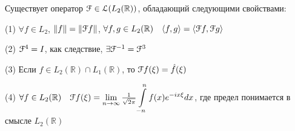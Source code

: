 \documentclass[a4paper,12pt]{report}
\begin{document}
\begin{thm}[Планшереля]Существует оператор $\EuScript F\in\EuScript L(L_2(\mathbb R))$, обладающий следующими свойствами:

(1) $\forall f\in L_2$, $\|f\|=\|\EuScript F f\|$, $\forall f,g\in L_2(\mathbb R)\quad\langle f,g\rangle=\langle\EuScript F f,\EuScript Fg\rangle$

(2) $\EuScript F^4=I$, как следствие, $\exists\EuScript F^{-1}=\EuScript F^3$

(3) Если $f\in L_2(\mathbb R)\cap L_1(\mathbb R)$, то $\EuScript F f(\xi)=\hat f(\xi)$

(4) $\forall f\in L_2(\mathbb R)\quad\EuScript Ff(\xi)=\lim\limits_{n\to\infty}\frac1{\sqrt{2\pi}}\displaystyle\int\limits_{-n}^n f(x)e^{-ix\xi}dx$, где предел понимается в смысле $L_2(\mathbb R)$
\end{thm}
\end{document}
